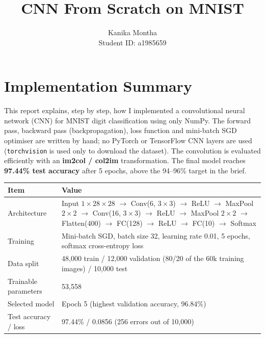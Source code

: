 \documentclass[11pt,a4paper]{article}
\title{\textbf{CNN From Scratch on MNIST}}
\author{Kanika Montha \\ Student ID: a1985659}
\date{}
\newcommand{\code}[1]{\texttt{#1}}
\begin{document}
\maketitle
\thispagestyle{fancy}

\section{Implementation Summary}
This report explains, step by step, how I implemented a convolutional neural network (CNN) for MNIST digit classification using only NumPy. The forward pass, backward pass (backpropagation), loss function and mini-batch SGD optimiser are written by hand; no PyTorch or TensorFlow CNN layers are used (\code{torchvision} is used only to download the dataset). The convolution is evaluated efficiently with an \textbf{im2col / col2im} transformation. The final model reaches \textbf{97.44\% test accuracy} after 5 epochs, above the 94--96\% target in the brief.

\begin{table}[H]
\centering
\begin{tabularx}{\linewidth}{@{}l X@{}}
\toprule
\textbf{Item} & \textbf{Value} \\
\midrule
Architecture & Input $1{\times}28{\times}28$ $\to$ Conv(6, $3{\times}3$) $\to$ ReLU $\to$ MaxPool $2{\times}2$ $\to$ Conv(16, $3{\times}3$) $\to$ ReLU $\to$ MaxPool $2{\times}2$ $\to$ Flatten(400) $\to$ FC(128) $\to$ ReLU $\to$ FC(10) $\to$ Softmax \\
Training & Mini-batch SGD, batch size 32, learning rate 0.01, 5 epochs, softmax cross-entropy loss \\
Data split & 48{,}000 train / 12{,}000 validation (80/20 of the 60k training images) / 10{,}000 test \\
Trainable parameters & 53{,}558 \\
Selected model & Epoch 5 (highest validation accuracy, 96.84\%) \\
Test accuracy / loss & 97.44\% / 0.0856 (256 errors out of 10{,}000) \\
\bottomrule
\end{tabularx}
\end{table}

\end{document}

